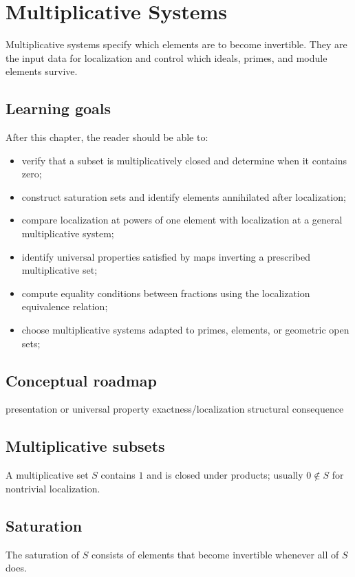 \chapter{Multiplicative Systems}
\label{ch:v05}

Multiplicative systems specify which elements are to become invertible. They are the input data for localization and control which ideals, primes, and module elements survive.

\section*{Learning goals}
After this chapter, the reader should be able to:
\begin{itemize}
\item verify that a subset is multiplicatively closed and determine when it contains zero;
\item construct saturation sets and identify elements annihilated after localization;
\item compare localization at powers of one element with localization at a general multiplicative system;
\item identify universal properties satisfied by maps inverting a prescribed multiplicative set;
\item compute equality conditions between fractions using the localization equivalence relation;
\item choose multiplicative systems adapted to primes, elements, or geometric open sets;
\end{itemize}
\section*{Conceptual roadmap}
\volroadmap
  {presentation or universal property}
  {exactness/localization}
  {structural consequence}

\section{Multiplicative subsets}
A multiplicative set $S$ contains $1$ and is closed under products; usually $0\notin S$ for nontrivial localization.

\section{Saturation}
The saturation of $S$ consists of elements that become invertible whenever all of $S$ does.

